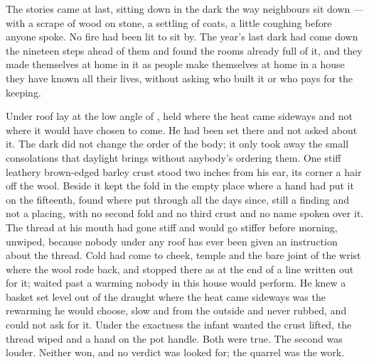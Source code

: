 The stories came at last, sitting down in the dark the way neighbours sit down --- with a scrape of wood on stone, a settling of coats, a little coughing before anyone spoke. No fire had been lit to sit by. The year's last dark had come down the nineteen steps ahead of them and found the rooms already full of it, and they made themselves at home in it as people make themselves at home in a house they have known all their lives, without asking who built it or who pays for the keeping.

Under  roof  lay at the low angle of , held where the heat came sideways and not where it would have chosen to come. He had been set there and not asked about it. The dark did not change the order of the body; it only took away the small consolations that daylight brings without anybody's ordering them. One stiff leathery brown-edged barley crust stood two inches from his ear, its corner a hair off the wool. Beside it  kept the fold in the empty place where a hand had put it on the fifteenth, found where put through all the days since, still a finding and not a placing, with no second fold and no third crust and no name spoken over it. The thread at his mouth had gone stiff and would go stiffer before morning, unwiped, because nobody under any roof has ever been given an instruction about the thread. Cold had come to cheek, temple and the bare joint of the wrist where the wool rode back, and stopped there as at the end of a line written out for it;  waited past a warming nobody in this house would perform. He knew a basket set level out of the draught where the heat came sideways was the rewarming he would choose, slow and from the outside and never rubbed, and could not ask for it. Under the exactness the infant wanted the crust lifted, the thread wiped and a hand on the pot handle. Both were true. The second was louder. Neither won, and no verdict was looked for; the quarrel was the work.

